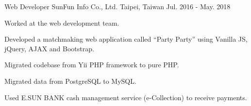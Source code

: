 \begin{cventries}
  \cventry
    {Web Developer} %
    {SunFun Info Co., Ltd.} %
    {Taipei, Taiwan} %
    {Jul. 2016 - May. 2018} %
    {
      \begin{cvitems} %
        \item {Worked at the web development team.}
        \item {Developed a matchmaking web application called “Party Party” using Vanilla JS, jQuery, AJAX and Bootstrap.}
        \item {Migrated codebase from Yii PHP framework to pure PHP.}
        \item {Migrated data from PostgreSQL to MySQL.}
        \item {Used E.SUN BANK cash management service (e-Collection) to receive payments.}
      \end{cvitems}
    }

\end{cventries}
